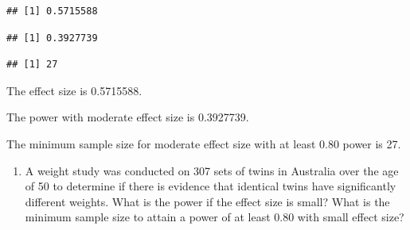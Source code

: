 \documentclass[
]{book}
\newenvironment{Shaded}{\begin{snugshade}}{\end{snugshade}}
\newcommand{\AttributeTok}[1]{\textcolor[rgb]{0.13,0.29,0.53}{#1}}
\newcommand{\DecValTok}[1]{\textcolor[rgb]{0.00,0.00,0.81}{#1}}
\newcommand{\DocumentationTok}[1]{\textcolor[rgb]{0.56,0.35,0.01}{\textbf{\textit{#1}}}}
\newcommand{\FloatTok}[1]{\textcolor[rgb]{0.00,0.00,0.81}{#1}}
\newcommand{\FunctionTok}[1]{\textcolor[rgb]{0.13,0.29,0.53}{\textbf{#1}}}
\newcommand{\NormalTok}[1]{#1}
\newcommand{\OtherTok}[1]{\textcolor[rgb]{0.56,0.35,0.01}{#1}}
\newcommand{\SpecialCharTok}[1]{\textcolor[rgb]{0.81,0.36,0.00}{\textbf{#1}}}
\newcommand{\StringTok}[1]{\textcolor[rgb]{0.31,0.60,0.02}{#1}}
\providecommand{\tightlist}{%
  \setlength{\itemsep}{0pt}\setlength{\parskip}{0pt}}
\theoremstyle{definition}
\theoremstyle{definition}
\theoremstyle{definition}
\theoremstyle{definition}
\theoremstyle{remark}
\begin{document}
\begin{verbatim}
## [1] 0.5715588
\end{verbatim}

\begin{Shaded}
\end{Shaded}

\begin{verbatim}
## [1] 0.3927739
\end{verbatim}

\begin{Shaded}
\end{Shaded}

\begin{verbatim}
## [1] 27
\end{verbatim}

The effect size is 0.5715588.

The power with moderate effect size is 0.3927739.

The minimum sample size for moderate effect size with at least 0.80 power is 27.

\begin{enumerate}
\def\labelenumi{\arabic{enumi}.}
\setcounter{enumi}{1}
\tightlist
\item
  A weight study was conducted on 307 sets of twins in Australia over the age of 50 to determine if there is evidence that identical twins have significantly different weights. What is the power if the effect size is small? What is the minimum sample size to attain a power of at least 0.80 with small effect size?
\end{enumerate}
\end{document}

